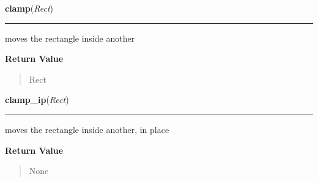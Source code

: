     \label{pygame:Rect:clamp}

    \vspace{0.5ex}

\hspace{.8\funcindent}\begin{boxedminipage}{\funcwidth}

    \raggedright \textbf{clamp}(\textit{Rect})

    \vspace{-1.5ex}

    \rule{\textwidth}{0.5\fboxrule}
\setlength{\parskip}{2ex}
    moves the rectangle inside another

\setlength{\parskip}{1ex}
      \textbf{Return Value}
    \vspace{-1ex}

      \begin{quote}
      Rect

      \end{quote}

    \end{boxedminipage}

    \label{pygame:Rect:clamp_ip}

    \vspace{0.5ex}

\hspace{.8\funcindent}\begin{boxedminipage}{\funcwidth}

    \raggedright \textbf{clamp\_ip}(\textit{Rect})

    \vspace{-1.5ex}

    \rule{\textwidth}{0.5\fboxrule}
\setlength{\parskip}{2ex}
    moves the rectangle inside another, in place

\setlength{\parskip}{1ex}
      \textbf{Return Value}
    \vspace{-1ex}

      \begin{quote}
      None

      \end{quote}

    \end{boxedminipage}

    \label{pygame:Rect:clip}

    \vspace{0.5ex}

